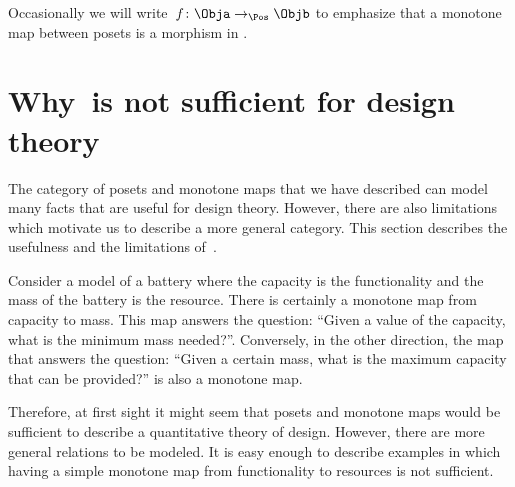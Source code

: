 Occasionally we will write~$f \colon \Obja \to_{\Pos} \Objb$ to emphasize that a monotone map between posets is a morphism in \Pos.


\section{Why~\Pos is not sufficient for design theory}

The category \Pos of posets and monotone maps that we have described can model many facts that are useful for design theory. However, there are also limitations which motivate us to describe a more general category. This section describes the usefulness and the limitations of~\Pos.

\begin{example}[Battery]
    Consider a model of a battery where the capacity is the functionality and the mass of the battery is the resource.
    There is certainly a monotone map from capacity to mass. This map answers the question: ``Given a value of the capacity, what is the minimum mass needed?''. Conversely, in the other direction, the map that answers the question: ``Given a certain mass, what is the maximum capacity that can be provided?'' is also a monotone map.
\end{example}

\begin{comment}
    \begin{figure}[h!]
        \centering
        \begin{tikzcd}
            \bullet &\arrow[l] \bullet\\[-15pt]
            \text{mass} & \text{capacity}
        \end{tikzcd}
        \caption{Example of the design of a battery. }
        \label{fig:battery-example}
    \end{figure}
\end{comment}

Therefore, at first sight it might seem that posets and monotone maps would be sufficient to describe a quantitative theory of design. However, there are more general relations to be modeled. It is easy enough to describe examples in which having a simple monotone map from functionality to resources is not sufficient.

